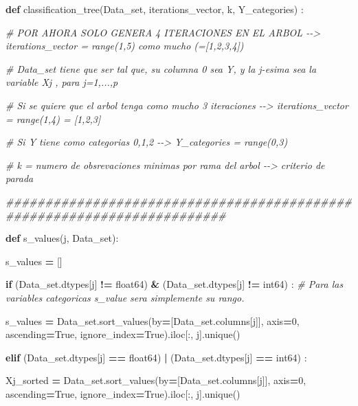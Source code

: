 \documentclass[
  11pt,
  a4paper,
]{article}
\newenvironment{Shaded}{\begin{snugshade}}{\end{snugshade}}
\newcommand{\CommentTok}[1]{\textcolor[rgb]{0.56,0.35,0.01}{\textit{#1}}}
\newcommand{\ControlFlowTok}[1]{\textcolor[rgb]{0.13,0.29,0.53}{\textbf{#1}}}
\newcommand{\DecValTok}[1]{\textcolor[rgb]{0.00,0.00,0.81}{#1}}
\newcommand{\KeywordTok}[1]{\textcolor[rgb]{0.13,0.29,0.53}{\textbf{#1}}}
\newcommand{\NormalTok}[1]{#1}
\newcommand{\OperatorTok}[1]{\textcolor[rgb]{0.81,0.36,0.00}{\textbf{#1}}}
\newcommand{\StringTok}[1]{\textcolor[rgb]{0.31,0.60,0.02}{#1}}
\newcommand{\VariableTok}[1]{\textcolor[rgb]{0.00,0.00,0.00}{#1}}
\begin{document}
\begin{Shaded}
\begin{Highlighting}[]
\KeywordTok{def}\NormalTok{ classification\_tree(Data\_set, iterations\_vector, k, Y\_categories) :}

\CommentTok{\# POR AHORA SOLO GENERA 4 ITERACIONES EN EL ARBOL {-}{-}\textgreater{} iterations\_vector = range(1,5) como mucho (=[1,2,3,4])}

\CommentTok{\# Data\_set tiene que ser tal que, su columna 0 sea Y, y la j{-}esima sea la variable Xj , para j=1,...,p}

\CommentTok{\# Si se quiere que el arbol tenga como mucho 3 iteraciones {-}{-}\textgreater{} iterations\_vector = range(1,4) = [1,2,3]}

\CommentTok{\# Si Y tiene como categorias 0,1,2 {-}{-}\textgreater{} Y\_categories = range(0,3)}

\CommentTok{\# k = numero de obsrevaciones minimas por rama del arbol {-}{-}\textgreater{} criterio de parada}

\CommentTok{\#\#\#\#\#\#\#\#\#\#\#\#\#\#\#\#\#\#\#\#\#\#\#\#\#\#\#\#\#\#\#\#\#\#\#\#\#\#\#\#\#\#\#\#\#\#\#\#\#\#\#\#\#\#\#\#\#\#\#\#\#\#\#\#\#\#\#\#\#\#\#\#}
    
    \KeywordTok{def}\NormalTok{ s\_values(j, Data\_set):}

\NormalTok{        s\_values }\OperatorTok{=}\NormalTok{ []}

        \ControlFlowTok{if}\NormalTok{  (Data\_set.dtypes[j] }\OperatorTok{!=} \StringTok{\textquotesingle{}float64\textquotesingle{}}\NormalTok{) }\OperatorTok{\&}\NormalTok{ (Data\_set.dtypes[j] }\OperatorTok{!=} \StringTok{\textquotesingle{}int64\textquotesingle{}}\NormalTok{) : }\CommentTok{\# Para las variables categoricas s\_value sera simplemente su rango.}

\NormalTok{            s\_values }\OperatorTok{=}\NormalTok{ Data\_set.sort\_values(by}\OperatorTok{=}\NormalTok{[Data\_set.columns[j]], axis}\OperatorTok{=}\DecValTok{0}\NormalTok{, ascending}\OperatorTok{=}\VariableTok{True}\NormalTok{, ignore\_index}\OperatorTok{=}\VariableTok{True}\NormalTok{).iloc[:, j].unique()}


        \ControlFlowTok{elif}\NormalTok{ (Data\_set.dtypes[j] }\OperatorTok{==} \StringTok{\textquotesingle{}float64\textquotesingle{}}\NormalTok{) }\OperatorTok{|}\NormalTok{ (Data\_set.dtypes[j] }\OperatorTok{==} \StringTok{\textquotesingle{}int64\textquotesingle{}}\NormalTok{) :}

\NormalTok{            Xj\_sorted }\OperatorTok{=}\NormalTok{ Data\_set.sort\_values(by}\OperatorTok{=}\NormalTok{[Data\_set.columns[j]], axis}\OperatorTok{=}\DecValTok{0}\NormalTok{, ascending}\OperatorTok{=}\VariableTok{True}\NormalTok{, ignore\_index}\OperatorTok{=}\VariableTok{True}\NormalTok{).iloc[:, j].unique()}


\end{Highlighting}
\end{Shaded}
\end{document}

